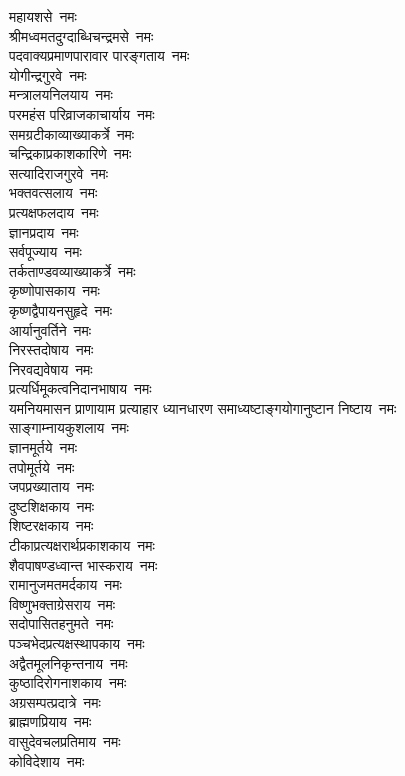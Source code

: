 \begin{flushleft}
\begin{multicols}{2}
महायशसे~नमः\\
श्रीमध्वमतदुग्दाब्धिचन्द्रमसे~नमः\\
पदवाक्यप्रमाणपारावार पारङ्गताय~नमः\\
योगीन्द्रगुरवे~नमः\\
मन्त्रालयनिलयाय~नमः\hfill{}\\
परमहंस परिव्राजकाचार्याय~नमः\\
समग्रटीकाव्याख्याकर्त्रे~नमः\\
चन्द्रिकाप्रकाशकारिणे~नमः\\
सत्यादिराजगुरवे~नमः\\
भक्तवत्सलाय~नमः\\
प्रत्यक्षफलदाय~नमः\\
ज्ञानप्रदाय~नमः\\
सर्वपूज्याय~नमः\\
तर्कताण्डवव्याख्याकर्त्रे~नमः\\
कृष्णोपासकाय~नमः\hfill{}\\
कृष्णद्वैपायनसुहृदे~नमः\\
आर्यानुवर्तिने~नमः\\
निरस्तदोषाय~नमः\\
निरवद्यवेषाय~नमः\\
प्रत्यर्धिमूकत्वनिदानभाषाय~नमः\\
यमनियमासन प्राणायाम प्रत्याहार ध्यानधारण समाध्यष्टाङ्गयोगानुष्टान निष्टाय~नमः\\
साङ्गाम्नायकुशलाय~नमः\\
ज्ञानमूर्तये~नमः\\
तपोमूर्तये~नमः\\
जपप्रख्याताय~नमः\hfill{}\\
दुष्टशिक्षकाय~नमः\\
शिष्टरक्षकाय~नमः\\
टीकाप्रत्यक्षरार्थप्रकाशकाय~नमः\\
शैवपाषण्डध्वान्त भास्कराय~नमः\\
रामानुजमतमर्दकाय~नमः\\
विष्णुभक्ताग्रेसराय~नमः\\
सदोपासितहनुमते~नमः\\
पञ्चभेदप्रत्यक्षस्थापकाय~नमः\\
अद्वैतमूलनिकृन्तनाय~नमः\\
कुष्ठादिरोगनाशकाय~नमः\hfill{}\\
अग्रसम्पत्प्रदात्रे~नमः\\
ब्राह्मणप्रियाय~नमः\\
वासुदेवचलप्रतिमाय~नमः\\
कोविदेशाय~नमः\\

\end{multicols}
\end{flushleft}
